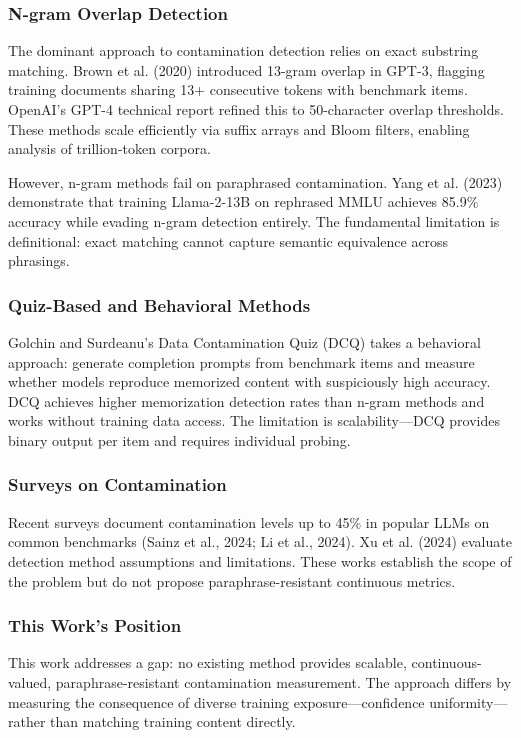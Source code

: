 
\subsubsection{N-gram Overlap Detection}

The dominant approach to contamination detection relies on exact substring matching. Brown et al. (2020) introduced 13-gram overlap in GPT-3, flagging training documents sharing 13+ consecutive tokens with benchmark items. OpenAI's GPT-4 technical report refined this to 50-character overlap thresholds. These methods scale efficiently via suffix arrays and Bloom filters, enabling analysis of trillion-token corpora.

However, n-gram methods fail on paraphrased contamination. Yang et al. (2023) demonstrate that training Llama-2-13B on rephrased MMLU achieves 85.9\% accuracy while evading n-gram detection entirely. The fundamental limitation is definitional: exact matching cannot capture semantic equivalence across phrasings.

\subsubsection{Quiz-Based and Behavioral Methods}

Golchin and Surdeanu's Data Contamination Quiz (DCQ) takes a behavioral approach: generate completion prompts from benchmark items and measure whether models reproduce memorized content with suspiciously high accuracy. DCQ achieves higher memorization detection rates than n-gram methods and works without training data access. The limitation is scalability---DCQ provides binary output per item and requires individual probing.

\subsubsection{Surveys on Contamination}

Recent surveys document contamination levels up to 45\% in popular LLMs on common benchmarks (Sainz et al., 2024; Li et al., 2024). Xu et al. (2024) evaluate detection method assumptions and limitations. These works establish the scope of the problem but do not propose paraphrase-resistant continuous metrics.

\subsubsection{This Work's Position}

This work addresses a gap: no existing method provides scalable, continuous-valued, paraphrase-resistant contamination measurement. The approach differs by measuring the consequence of diverse training exposure---confidence uniformity---rather than matching training content directly.
